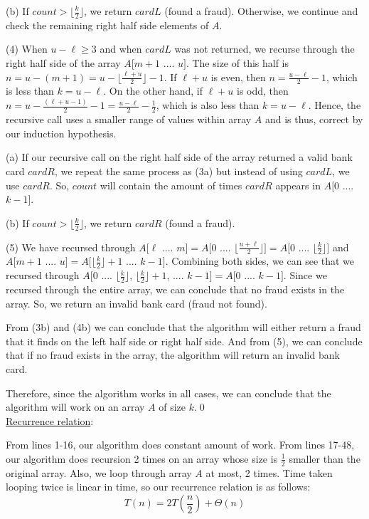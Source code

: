 \documentclass[11pt]{article}
\begin{document}
\begin{itemize}
\phantom{(3) } (b) If $count > \lfloor \frac{k}{2} \rfloor$, we return $cardL$ (found a fraud). Otherwise, we continue and check the remaining right half side elements of $A$.

(4) When $u - \ell \geq 3$ and when $cardL$ was not returned, we recurse through the right half side of the array $A[m+1$ .... $u]$. The size of this half is $n=u-(m+1)=u-\lfloor \frac{\ell + u}{2} \rfloor - 1$. If $\ell + u$ is even, then $n=\frac{u-\ell}{2}-1$, which is less than $k=u-\ell$. On the other hand, if $\ell + u$ is odd, then $n=u- \frac{(\ell + u - 1)}{2} -1 = \frac{u-\ell}{2} - \frac{1}{2}$, which is also less than $k=u-\ell$. Hence, the recursive call uses a smaller range of values within array $A$ and is thus, correct by our induction hypothesis.

\phantom{(4) } (a) If our recursive call on the right half side of the array returned a valid bank card $cardR$, we repeat the same process as (3a) but instead of using $cardL$, we use $cardR$. So, $count$ will contain the amount of times $cardR$ appears in $A[0$ .... $k - 1]$.

\phantom{(4) } (b) If $count > \lfloor \frac{k}{2} \rfloor$, we return $cardR$ (found a fraud).

(5) We have recursed through $A[\ell$ .... $m] = A[0$ .... $\lfloor \frac{u + \ell}{2} \rfloor ] = A[0$ .... $\lfloor \frac{k}{2} \rfloor]$ and $A[m+1$ .... $u] = A[\lfloor \frac{k}{2} \rfloor + 1$ .... $k-1]$. Combining both sides, we can see that we recursed through $A[0$ .... $\lfloor \frac{k}{2} \rfloor$, $\lfloor \frac{k}{2} \rfloor + 1$, .... $k-1] = A[0$ .... $k-1]$. Since we recursed through the entire array, we can conclude that no fraud exists in the array. So, we return an invalid bank card (fraud not found).

From (3b) and (4b) we can conclude that the algorithm will either return a fraud that it finds on the left half side or right half side. And from (5), we can conclude that if no fraud exists in the array, the algorithm will return an invalid bank card.

Therefore, since the algorithm works in all cases, we can conclude that the algorithm will work on an array $A$ of size $k$.\hspace{12.6cm}\qed\\

\underline{Recurrence relation}:

From lines 1-16, our algorithm does constant amount of work. From lines  17-48, our algorithm does recursion 2 times on an array whose size is $\frac{1}{2}$ smaller than the original array. Also, we loop through array $A$ at most, 2 times. Time taken looping twice is linear in time, so our recurrence relation is as follows: $$\boxed{T(n) = 2T(\frac{n}{2}) + \Theta(n)}$$


\end{itemize}
\end{document}
